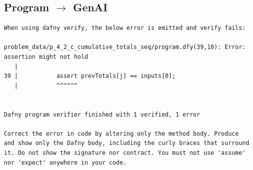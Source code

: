 \documentclass{article}
\begin{document}
\subsection*{Program $\rightarrow$ GenAI}
\begin{lstlisting}
When using dafny verify, the below error is emitted and verify fails:

problem_data/p_4_2_c_cumulative_totals_seq/program.dfy(39,10): Error: assertion might not hold
   |
39 |           assert prevTotals[j] == inputs[0];
   |           ^^^^^^


Dafny program verifier finished with 1 verified, 1 error

Correct the error in code by altering only the method body. Produce and show only the Dafny body, including the curly braces that surround it. Do not show the signature nor contract. You must not use 'assume' nor 'expect' anywhere in your code.
\end{lstlisting}
\end{document}
